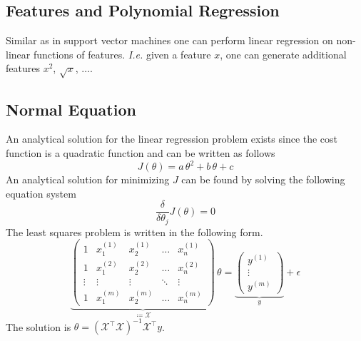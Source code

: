 \documentclass[a4paper,twoside,10pt]{article}
\begin{document}
\subsection{Features and Polynomial Regression}\label{cha:polyregression}
Similar as in support vector machines one can perform linear regression on non-linear functions of features.
\emph{I.e.} given a feature $x$, one can generate additional features $x^2$, $\sqrt x$, $\ldots$.

\subsection{Normal Equation}\label{cha:normal}
An analytical solution for the linear regression problem exists since the cost function is a quadratic function and
can be written as follows
\begin{equation*}
  J(\theta)=a\,\theta^2+b\,\theta+c
\end{equation*}
An analytical solution for minimizing $J$ can be found by solving the following equation system
\begin{equation*}
  \frac{\delta}{\delta\theta_j}J(\theta)=0
\end{equation*}
The least squares problem is written in the following form.
\begin{equation*}
  \underbrace{\begin{pmatrix}
1&x^{(1)}_1&x^{(1)}_2&\hdots&x^{(1)}_n\\
1&x^{(2)}_1&x^{(2)}_2&\hdots&x^{(2)}_n\\
\vdots&\vdots&\vdots&\ddots&\vdots\\
1&x^{(m)}_1&x^{(m)}_2&\hdots&x^{(m)}_n
  \end{pmatrix}}_{\coloneqq\mathcal{X}}\,\theta=
\underbrace{\begin{pmatrix}y^{(1)}\\\vdots\\y^{(m)}\end{pmatrix}}_{y}+\epsilon
\end{equation*}
The solution is $\theta=(\mathcal{X}^\top\mathcal{X})^{-1}\mathcal{X}^\top y$.
\end{document}
